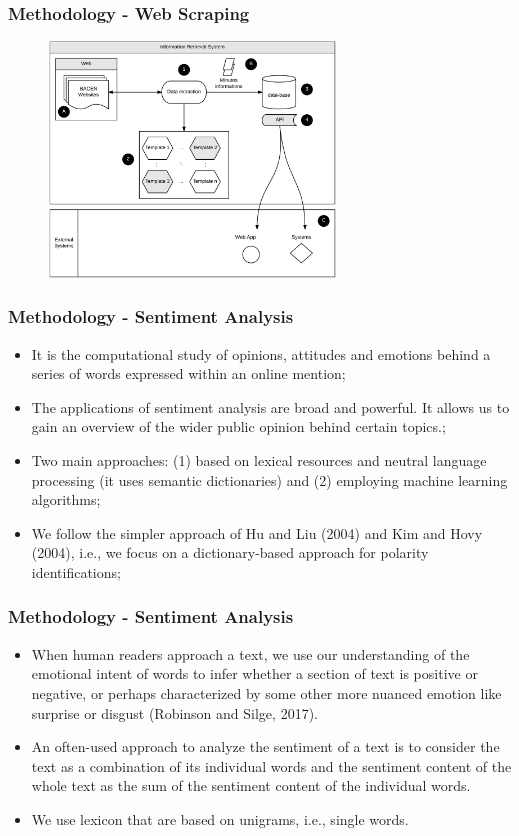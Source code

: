 \documentclass[aspectratio=169]{beamer}
\begin{document}
\begin{frame}\frametitle{Methodology - Web Scraping}
  \begin{figure}[hb]
  \includegraphics[width=3in]{minutes_crawler_diagram.png}
  \label{fig01}
  \end{figure}
\end{frame}

\begin{frame}\frametitle{Methodology - Sentiment Analysis}
  \begin{itemize}
  	\item It is the computational study of opinions, attitudes and emotions behind a series of words expressed within an online mention;
    \item The applications of sentiment analysis are broad and powerful. It allows us to gain an overview of the wider public opinion behind certain topics.;
    \item Two main approaches: (1) based on lexical resources and neutral language processing (it uses semantic dictionaries) and (2) employing machine learning algorithms;
    \item We follow the simpler approach of Hu and Liu (2004) and Kim and Hovy (2004), i.e., we focus on a dictionary-based approach for polarity identifications;
    \end{itemize}
\end{frame}

\begin{frame}\frametitle{Methodology - Sentiment Analysis}
\begin{itemize}
	\item When human readers approach a text, we use our understanding of the emotional intent of words to infer whether a section of text is positive or negative, or perhaps characterized by some other more nuanced emotion like surprise or disgust (Robinson and Silge, 2017).
	\item An often-used approach to analyze the sentiment of a text is to consider the text as a combination of its individual words and the sentiment content of the whole text as the sum of the sentiment content of the individual words. 
	\item We use lexicon that are based on unigrams, i.e., single words. 
\end{itemize}
\end{frame}
\end{document}
